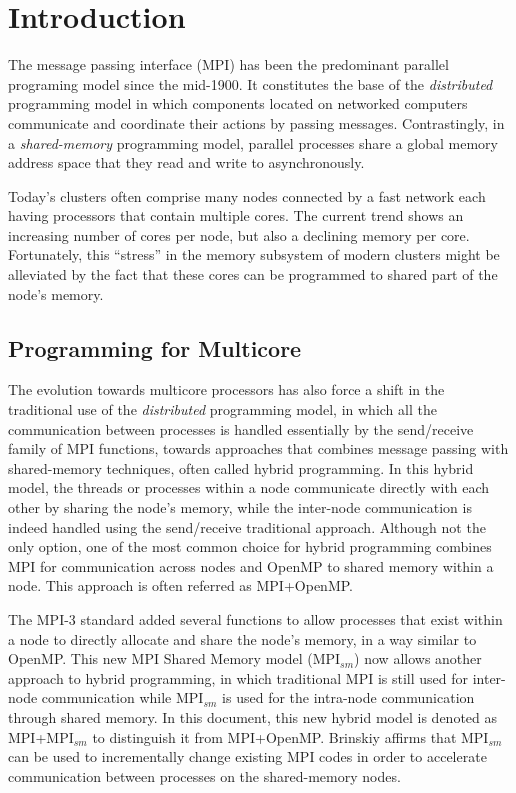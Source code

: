 \section{Introduction}
The message passing interface (MPI) has been the predominant parallel programing model since the mid-1900. It constitutes the base of the \emph{distributed} programming model in which components located on networked computers communicate and coordinate their actions by passing messages. Contrastingly, in a \emph{shared-memory} programming model, parallel processes share a global memory address space that they read and write to asynchronously. 

Today's clusters often comprise many nodes connected by a fast network each having processors that contain multiple cores. The current trend shows an increasing number of cores per node, but also a declining memory per core. Fortunately, this ``stress'' in the memory subsystem of modern clusters might be alleviated by the fact that these cores can be programmed to shared part of the node's memory.

\subsection*{Programming for Multicore}

The evolution towards multicore processors has also force a shift in the traditional use of the \emph{distributed} programming model, in which all the communication between processes is handled essentially by the send/receive family of MPI functions, towards approaches that combines message passing with shared-memory techniques, often called hybrid programming\cite{UsingAdvancedMPI}. In this hybrid model, the threads or processes within a node communicate directly with each other by sharing the node's memory, while the inter-node communication is indeed handled using the send/receive traditional approach. Although not the only option, one of the most common choice for hybrid programming combines MPI for communication across nodes and OpenMP to shared memory within a node. This approach is often referred as MPI+OpenMP.

\medskip

The MPI-3 standard added several functions to allow processes that exist within a node to directly allocate and share the node's memory, in a way similar to OpenMP. This new MPI Shared Memory model (MPI$_{sm}$) now allows another approach to hybrid programming, in which traditional MPI is still used for inter-node communication while MPI$_{sm}$ is used for the intra-node communication through shared memory. In this document, this new hybrid model is denoted as MPI+MPI$_{sm}$ to distinguish it from MPI+OpenMP. Brinskiy\cite{brinskiy2015} affirms that MPI$_{sm}$ can be used to incrementally change existing MPI codes in order to accelerate communication between processes on the shared-memory nodes.


